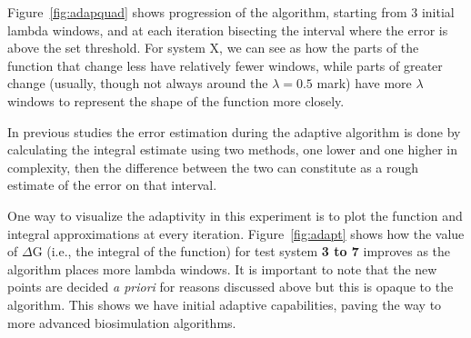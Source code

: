 Figure~\ref{fig:adapquad} shows progression of the algorithm, starting from  
3 initial lambda windows, and at each iteration bisecting the interval where 
the error is above the set threshold. For system X, we can see as how the parts 
of the function that change less have relatively fewer windows, while parts of 
greater change (usually, though not always around the $\lambda=0.5$ mark) have 
more $\lambda$ windows to represent the shape of the function more closely. 

 In previous studies \cite{} the 
error estimation during the adaptive algorithm is done by calculating the 
integral estimate using two methods, one lower and one higher in complexity, 
then the difference between the two can constitute as a rough estimate of the 
error on that interval.


One way to visualize the adaptivity in this experiment is to plot the
function and integral approximations at every iteration.
Figure~\ref{fig:adapt} shows how the value of $\Delta$G (i.e., the integral
of the function) for test system \textbf{3 to 7}  improves as the
algorithm places more lambda windows. It is important to note that the new
points are decided {\it a priori} for reasons discussed above but this is
opaque to the algorithm. This shows we have initial adaptive capabilities,
paving the way to more advanced biosimulation algorithms.

